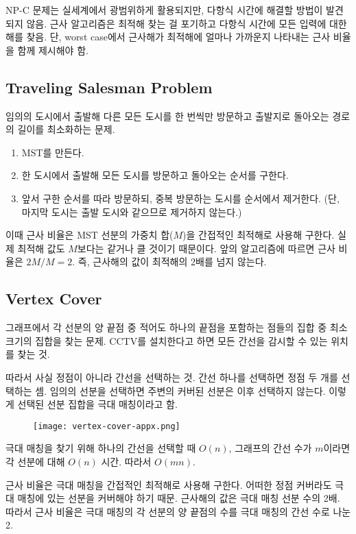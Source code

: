 NP-C 문제는 실세계에서 광범위하게 활용되지만, 다항식 시간에 해결할 방법이 발견되지 않음. 근사 알고리즘은 최적해 찾는 걸 포기하고 다항식 시간에 모든 입력에 대한 해를 찾음. 단, worst case에서 근사해가 최적해에 얼마나 가까운지 나타내는 근사 비율을 함께 제시해야 함.

\subsection{Traveling Salesman Problem}

임의의 도시에서 출발해 다른 모든 도시를 한 번씩만 방문하고 출발지로 돌아오는 경로의 길이를 최소화하는 문제.

\begin{enumerate}
  \item MST를 만든다.
  \item 한 도시에서 출발해 모든 도시를 방문하고 돌아오는 순서를 구한다.
  \item 앞서 구한 순서를 따라 방문하되, 중복 방문하는 도시를 순서에서 제거한다. (단, 마지막 도시는 출발 도시와 같으므로 제거하지 않는다.)
\end{enumerate}

이때 근사 비율은 MST 선분의 가중치 합($M$)을 간접적인 최적해로 사용해 구한다. 실제 최적해 값도 $M$보다는 같거나 클 것이기 때문이다. 앞의 알고리즘에 따르면 근사 비율은 $2M / M = 2$. 즉, 근사해의 값이 최적해의 2배를 넘지 않는다.

\subsection{Vertex Cover}

그래프에서 각 선분의 양 끝점 중 적어도 하나의 끝점을 포함하는 점들의 집합 중 최소 크기의 집합을 찾는 문제. CCTV를 설치한다고 하면 모든 간선을 감시할 수 있는 위치를 찾는 것.

따라서 사실 정점이 아니라 간선을 선택하는 것. 간선 하나를 선택하면 정점 두 개를 선택하는 셈. 임의의 선분을 선택하면 주변의 커버된 선분은 이후 선택하지 않는다. 이렇게 선택된 선분 집합을 극대 매칭이라고 함.

\begin{figure}[h]
  \centering
  \texttt{[image: vertex-cover-appx.png]}
\end{figure}

극대 매칭을 찾기 위해 하나의 간선을 선택할 때 $O(n)$, 그래프의 간선 수가 $m$이라면 각 선분에 대해 $O(n)$ 시간. 따라서 $O(mn)$.

근사 비율은 극대 매칭을 간접적인 최적해로 사용해 구한다. 어떠한 정점 커버라도 극대 매칭에 있는 선분을 커버해야 하기 때문. 근사해의 값은 극대 매칭 선분 수의 2배. 따라서 근사 비율은 극대 매칭의 각 선분의 양 끝점의 수를 극대 매칭의 간선 수로 나눈 2.

